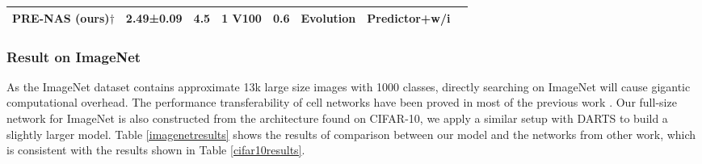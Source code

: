 \documentclass[sigconf]{acmart}
\begin{document}
\begin{table*}[!th]
\begin{tabular}{l|c|c|c|c|c|c|c}
PRE-NAS (ours)$\dagger$                                       & 2.49±0.09                                                                                      & 4.5                                                           & 1 V100                             & 0.6                                                                         & Evolution                                  & Predictor+w/i                                      \\ \hline
\end{tabular}
\caption{Performance comparison between the networks found by PRE-NAS and other search algorithms on CIFAR-10, the lower test error rate is better. $\dagger$ means the method has also been used on DARTS search space.  $\star$ indicates the original paper only provided their best performance. Dash means the original paper has not provided the information. `w/i' is short for the weight inheritance training.}
\label{cifar10results}
\end{table*}

\subsubsection{Result on ImageNet}
As the ImageNet dataset contains approximate 13k large size images with 1000 classes, directly searching on ImageNet will cause gigantic computational overhead. The performance transferability of cell networks have been proved in most of the previous work \cite{Ref:10,Ref:21,Ref:35,Ref:50}. Our full-size network for ImageNet is also constructed from the architecture found on CIFAR-10, we apply a similar setup with DARTS \cite{Ref:10} to build a slightly larger model. Table \ref{imagenetresults} shows the results of comparison between our model and the networks from other work, which is consistent with the results shown in Table \ref{cifar10results}.
\end{document}
